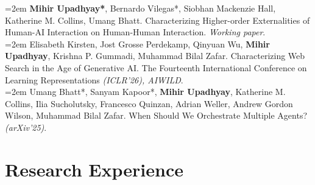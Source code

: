\documentclass[a4paper,10pt]{article}
\begin{document}
\noindent
\hangindent=2em
\makebox[2em][l]{[3]}%
\textbf{Mihir Upadhyay*}, Bernardo Vilegas*, Siobhan Mackenzie Hall, Katherine M. Collins, Umang Bhatt. 
Characterizing Higher-order Externalities of Human-AI Interaction on Human-Human Interaction. 
\textit{Working paper}.\\

\noindent
\hangindent=2em
\makebox[2em][l]{[2]}%
Elisabeth Kirsten, Jost Grosse Perdekamp, Qinyuan Wu, \textbf{Mihir Upadhyay}, Krishna P. Gummadi, Muhammad Bilal Zafar. 
Characterizing Web Search in the Age of Generative AI. The Fourteenth International Conference on Learning Representations \textit{(ICLR'26), AIWILD}.\\

\noindent
\hangindent=2em
\makebox[2em][l]{[1]}%
Umang Bhatt*, Sanyam Kapoor*, \textbf{Mihir Upadhyay}, Katherine M. Collins, Ilia Sucholutsky, Francesco Quinzan, Adrian Weller, Andrew Gordon Wilson, Muhammad Bilal Zafar. 
When Should We Orchestrate Multiple Agents? \textit{(arXiv’25)}. 

\section*{Research Experience}

\end{document}
